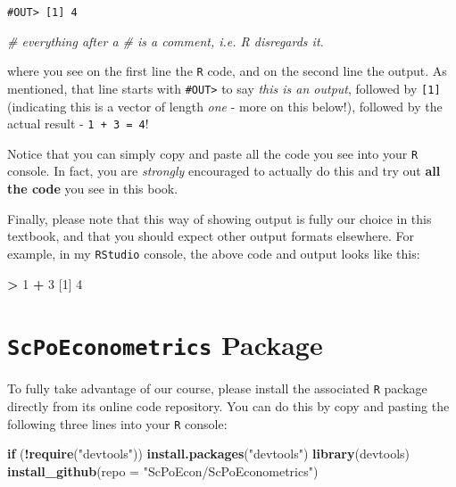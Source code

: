 \documentclass[]{book}
\newenvironment{Shaded}{\begin{snugshade}}{\end{snugshade}}
\newcommand{\CommentTok}[1]{\textcolor[rgb]{0.56,0.35,0.01}{\textit{#1}}}
\newcommand{\ControlFlowTok}[1]{\textcolor[rgb]{0.13,0.29,0.53}{\textbf{#1}}}
\newcommand{\DataTypeTok}[1]{\textcolor[rgb]{0.13,0.29,0.53}{#1}}
\newcommand{\DecValTok}[1]{\textcolor[rgb]{0.00,0.00,0.81}{#1}}
\newcommand{\KeywordTok}[1]{\textcolor[rgb]{0.13,0.29,0.53}{\textbf{#1}}}
\newcommand{\NormalTok}[1]{#1}
\newcommand{\OperatorTok}[1]{\textcolor[rgb]{0.81,0.36,0.00}{\textbf{#1}}}
\newcommand{\StringTok}[1]{\textcolor[rgb]{0.31,0.60,0.02}{#1}}
\begin{document}
\begin{verbatim}
#OUT> [1] 4
\end{verbatim}

\begin{Shaded}
\begin{Highlighting}[]
\CommentTok{# everything after a # is a comment, i.e. R disregards it.}
\end{Highlighting}
\end{Shaded}

where you see on the first line the \texttt{R} code, and on the second line the output. As mentioned, that line starts with \texttt{\#OUT\textgreater{}} to say \emph{this is an output}, followed by \texttt{{[}1{]}} (indicating this is a vector of length \emph{one} - more on this below!), followed by the actual result - \texttt{1\ +\ 3\ =\ 4}!

Notice that you can simply copy and paste all the code you see into your \texttt{R} console. In fact, you are \emph{strongly} encouraged to actually do this and try out \textbf{all the code} you see in this book.

Finally, please note that this way of showing output is fully our choice in this textbook, and that you should expect other output formats elsewhere. For example, in my \texttt{RStudio} console, the above code and output looks like this:

\begin{Shaded}
\begin{Highlighting}[]
\OperatorTok{>}\StringTok{ }\DecValTok{1} \OperatorTok{+}\StringTok{ }\DecValTok{3}
\NormalTok{[}\DecValTok{1}\NormalTok{] }\DecValTok{4}
\end{Highlighting}
\end{Shaded}

\hypertarget{install-package}{%
\section{\texorpdfstring{\texttt{ScPoEconometrics} Package}{ScPoEconometrics Package}}\label{install-package}}

To fully take advantage of our course, please install the associated \texttt{R} package directly from its online code repository. You can do this by copy and pasting the following three lines into your \texttt{R} console:

\begin{Shaded}
\begin{Highlighting}[]
\ControlFlowTok{if}\NormalTok{ (}\OperatorTok{!}\KeywordTok{require}\NormalTok{(}\StringTok{"devtools"}\NormalTok{)) }\KeywordTok{install.packages}\NormalTok{(}\StringTok{"devtools"}\NormalTok{)}
\KeywordTok{library}\NormalTok{(devtools)}
\KeywordTok{install_github}\NormalTok{(}\DataTypeTok{repo =} \StringTok{"ScPoEcon/ScPoEconometrics"}\NormalTok{)}
\end{Highlighting}
\end{Shaded}
\end{document}
